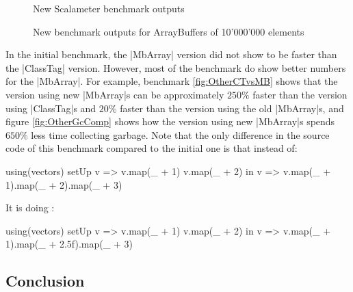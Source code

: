 \begin{figure}
\caption{New Scalameter benchmark outputs}
\label{fig:NewCTvsMB}
\end{figure}  

\begin{figure}
\caption{New benchmark outputs for ArrayBuffers of 10'000'000 elements}
\label{fig:NewGcComp}
\end{figure}

In the initial benchmark, the |MbArray| version did not show to be faster than the |ClassTag| version. However, most of the benchmark do show better numbers for the |MbArray|. For example, benchmark \ref{fig:OtherCTvsMB} shows that the version using new |MbArray|s can be approximately $250\%$ faster than the version using |ClassTag|s and $20\%$ faster than the version using the old |MbArray|s, and figure \ref{fig:OtherGcComp} shows how the version using new |MbArray|s spends $650\%$ less time collecting garbage. Note that the only difference in the source code of this benchmark compared to the initial one is that instead of:

\begin{lstlisting-nobreak}
  using(vectors) setUp {
    v => 
      v.map(_ + 1)
      v.map(_ + 2)
  } in {
    v => v.map(_ + 1).map(_ + 2).map(_ + 3)
  }
\end{lstlisting-nobreak}

It is doing : 

\begin{lstlisting-nobreak}
  using(vectors) setUp {
    v => 
      v.map(_ + 1)
      v.map(_ + 2)
  } in {
    v => v.map(_ + 1).map(_ + 2.5f).map(_ + 3)
  }
\end{lstlisting-nobreak}

\subsection{Conclusion}

